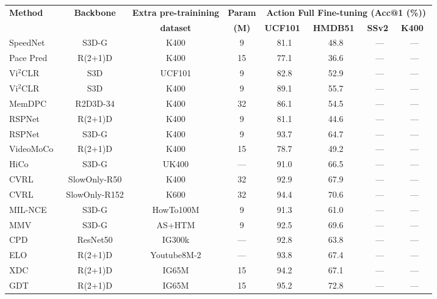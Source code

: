 \begin{table*}[t!]
\vspace{-20pt}
\centering
\scriptsize
\begin{tabular}[t]{lccccccc}
\toprule
\multirow{2}{*}{\textbf{Method}} & \multirow{2}{*}{\textbf{Backbone}} & \textbf{Extra pre-trainining} & \textbf{Param} & \multicolumn{4}{c}{\textbf{Action Full Fine-tuning (Acc@1 (\%))}} \\
& & \textbf{dataset} & \textbf{(M)} & \textbf{UCF101}~\cite{soomro2012ucf101} & \textbf{HMDB51}~\cite{kuehne2011hmdb} & \textbf{SSv2}~\cite{goyal2017something} & \textbf{K400}~\cite{kay2017kinetics} \\
\midrule\midrule
SpeedNet~\cite{benaim2020speednet} & S3D-G & K400 & 9 & 81.1 & 48.8 & — & — \\
Pace Pred~\cite{wang2020self} & R(2+1)D & K400 & 15 & 77.1 & 36.6 & — & — \\
Vi$^2$CLR~\cite{diba2021vi2clr} & S3D & UCF101 & 9 & 82.8 & 52.9 & — & — \\
Vi$^2$CLR~\cite{diba2021vi2clr} & S3D & K400 & 9 & 89.1 & 55.7 & — & — \\
MemDPC~\cite{han2020memory} & R2D3D-34 & K400 & 32 & 86.1 & 54.5 & — & — \\
RSPNet~\cite{chen2021rspnet} & R(2+1)D & K400 & 9 & 81.1 & 44.6 & — & — \\
RSPNet~\cite{chen2021rspnet} & S3D-G & K400 & 9 & 93.7 & 64.7 & — & — \\
VideoMoCo~\cite{pan2021videomoco} & R(2+1)D & K400 & 15 & 78.7 & 49.2 & — & — \\
HiCo~\cite{qing2022learning} & S3D-G & UK400 & — & 91.0 & 66.5 & — & — \\
CVRL~\cite{qian2021spatiotemporal} & SlowOnly-R50 & K400 & 32 & 92.9 & 67.9 & — & — \\
CVRL~\cite{qian2021spatiotemporal} & SlowOnly-R152 & K600 & 32 & 94.4 & 70.6& — & — \\

MIL-NCE~\cite{miech2020end} & S3D-G & HowTo100M & 9 & 91.3 & 61.0 & — & — \\
MMV~\cite{alayrac2020self} & S3D-G & AS+HTM & 9 & 92.5 & 69.6 & — & — \\
CPD~\cite{li2020learning} & ResNet50 & IG300k & — & 92.8 & 63.8 & — & — \\
ELO~\cite{piergiovanni2020evolving} & R(2+1)D & Youtube8M-2 & — & 93.8 & 67.4 & — & — \\
XDC~\cite{alwassel2020self} & R(2+1)D & IG65M & 15 & 94.2 & 67.1 & — & — \\
GDT~\cite{patrick2021multi} & R(2+1)D & IG65M & 15 & 95.2 & 72.8 & — & — \\


\end{tabular}
\end{table*}
